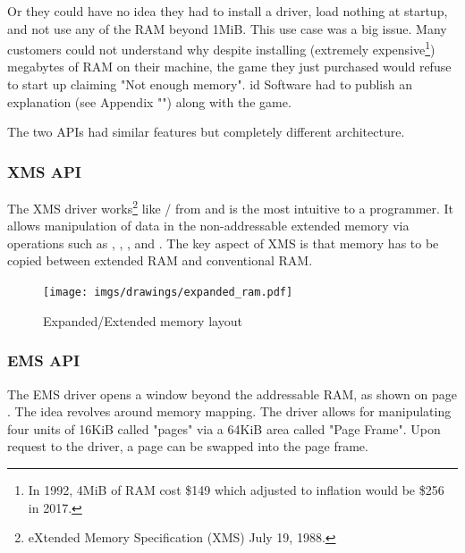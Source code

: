 \documentclass[book.tex]{subfiles}
\begin{document}
Or they could have no idea they had to install a driver, load nothing at startup, and not use any of the RAM beyond 1MiB. This use case was a big issue. Many customers could not understand why despite installing (extremely expensive\footnote{In 1992, 4MiB of RAM cost \$149 which adjusted to inflation would be \$256 in 2017.}) megabytes of RAM on their machine, the game they just purchased would refuse to start up claiming "Not enough memory". id Software had to publish an explanation (see Appendix "") along with the game.\\
\par

The two APIs had similar features but completely different architecture.\\
\par
\subsubsection{XMS API}
The XMS driver works\footnote{eXtended Memory Specification (XMS) July 19, 1988.} like / from  and is the most intuitive to a programmer. It allows manipulation of data in the non-addressable extended memory via operations such as , , , and . The key aspect of XMS is that memory has to be copied between extended RAM and conventional RAM.\\
\par


\begin{figure}[H]
\centering
\texttt{[image: imgs/drawings/expanded\_ram.pdf]}
\caption{Expanded/Extended memory layout}
\label{fig:ems_xms_layout}
\end{figure}





\subsubsection{EMS API}
The EMS driver opens a window beyond the addressable RAM, as shown on page \pageref{fig:ems_xms_layout}. The idea revolves around memory mapping. The driver allows for manipulating four units of 16KiB called "pages" via a 64KiB area called "Page Frame". Upon request to the driver, a page can be swapped into the page frame.\\
\par
\end{document}
